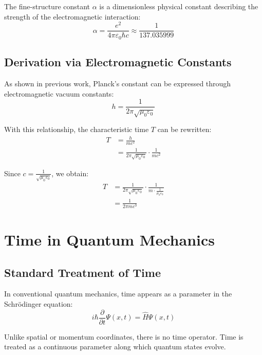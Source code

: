 \documentclass{article}
\begin{document}
	The fine-structure constant $\alpha$ is a dimensionless physical constant describing the strength of the electromagnetic interaction:
	\begin{equation}
		\alpha = \frac{e^2}{4\pi\varepsilon_0\hbar c} \approx \frac{1}{137.035999}
	\end{equation}
	
	\subsection{Derivation via Electromagnetic Constants}
	
	As shown in previous work, Planck's constant can be expressed through electromagnetic vacuum constants:
	\begin{equation}
		h = \frac{1}{2\pi\sqrt{\mu_0\varepsilon_0}}
	\end{equation}
	
	With this relationship, the characteristic time $T$ can be rewritten:
	\begin{align}
		T &= \frac{h}{mc^2} \\
		&= \frac{1}{2\pi\sqrt{\mu_0\varepsilon_0}} \cdot \frac{1}{mc^2}
	\end{align}
	
	Since $c = \frac{1}{\sqrt{\mu_0\varepsilon_0}}$, we obtain:
	\begin{align}
		T &= \frac{1}{2\pi\sqrt{\mu_0\varepsilon_0}} \cdot \frac{1}{m \cdot \frac{1}{\mu_0\varepsilon_0}} \\
		&= \frac{1}{2\pi m c^3}
	\end{align}
	
	\section{Time in Quantum Mechanics}
	
	\subsection{Standard Treatment of Time}
	
	In conventional quantum mechanics, time appears as a parameter in the Schrödinger equation:
	\begin{equation}
		i\hbar \frac{\partial}{\partial t}\Psi(x,t) = \hat{H}\Psi(x,t)
	\end{equation}
	
	Unlike spatial or momentum coordinates, there is no time operator. Time is treated as a continuous parameter along which quantum states evolve.
	
\end{document}
